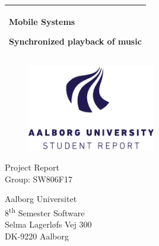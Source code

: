 %
\newcommand{\titlefont}{\sffamily\fontsize{36pt}{0pt}\selectfont}
\newcommand{\subtitlefont}{\sffamily\fontsize{26pt}{0pt}\selectfont}
\newcommand{\otherfont}{\sffamily\fontsize{18pt}{0pt}\selectfont}
\newcommand{\smallfont}{\sffamily\fontsize{12pt}{0pt}\selectfont}
\begin{titlepage}
    \addtolength{\hoffset}{0.5\evensidemargin-0.5\oddsidemargin} %
    \noindent%
    \begin{tabular}{@{}p{\textwidth}@{}}
        \toprule[2pt]
        \midrule
        \vspace{0.2cm}
        \begin{center}
        \titlefont Mobile Systems
        \end{center}
    \vspace{0.1cm}
        \begin{center}
        \subtitlefont Synchronized playback of music
    \end{center}
        \vspace{0.2cm}\\
        \midrule
        \toprule[2pt]
    \end{tabular}
    \vspace{1.5 cm}
    \begin{figure}[h!]
        \centering
        \includegraphics[width=0.5\textwidth]{img/aau_logo_en.pdf}
    \end{figure}
    \vspace{1.5 cm}
    \begin{center}
        \otherfont
            Project Report
        \\
        \vspace{0.2cm}
        \otherfont
            Group: SW806F17
    \end{center}
    \vfill
    \begin{center}
    \smallfont
    Aalborg Universitet\\
    8\textsuperscript{th} Semester Software\\ \vspace{0.1cm}
    Selma Lagerløfs Vej 300\\
    DK-9220 Aalborg
    \end{center}
\end{titlepage}
\clearpage
\cleardoublepage
